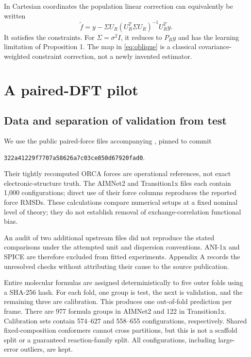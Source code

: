 \documentclass[11pt]{article}
\begin{document}
In Cartesian coordinates the population linear correction can equivalently be
written
\begin{equation}\label{eq:oblique}
 \widetilde f=y-\Sigma U_R(U_R^T\Sigma U_R)^{-1}U_R^Ty.
\end{equation}
It satisfies the constraints. For $\Sigma=\sigma^2I$, it reduces to $P_Ry$ and has
the learning limitation of Proposition 1. The map in \eqref{eq:oblique} is a
classical covariance-weighted constraint correction, not a newly invented estimator.

\section{A paired-DFT pilot}
\subsection{Data and separation of validation from test}
We use the public paired-force files accompanying \citet{kuryla2025}, pinned to
commit
\begin{center}\small\texttt{322a41229f7707a58626a7c03ce850d67920fad0}.\end{center}
Their tightly recomputed
ORCA forces are operational references, not exact electronic-structure truth.
The AIMNet2 and Transition1x files each contain 1,000 configurations; direct use
of their force columns reproduces the reported force RMSDs. These calculations
compare numerical setups at a fixed nominal level of theory; they do not establish
removal of exchange-correlation functional bias.

An audit of two additional upstream files did not reproduce the stated comparisons
under the attempted unit and dispersion conventions. ANI-1x and SPICE are therefore
excluded from fitted experiments. Appendix A records the unresolved checks without
attributing their cause to the source publication.

Entire molecular formulas are assigned deterministically to five outer folds using
a SHA-256 hash. For each fold, one group is test, the next is validation, and the
remaining three are calibration. This produces one out-of-fold prediction per frame.
There are 977 formula groups in AIMNet2 and 122 in Transition1x. Calibration sets
contain 574--627 and 558--655 configurations, respectively. Shared fixed-composition
conformers cannot cross partitions, but this is not a scaffold split or a guaranteed
reaction-family split. All configurations, including large-error outliers, are kept.
\end{document}
